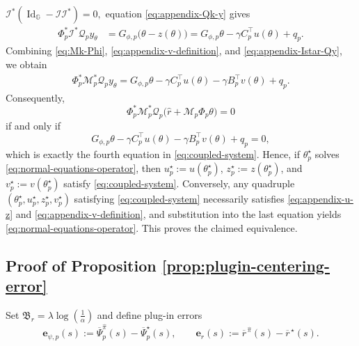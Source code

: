 \documentclass{article}
\theoremstyle{definition}
\theoremstyle{remark}
\theoremstyle{plain}
\newcommand{\dsieve}{p}
\numberwithin{equation}{section}
\begin{document}
\(
    \mathcal I^\ast
    (\operatorname{Id}_{\mathbb G}-\mathcal I\mathcal I^\ast)
    =
    0,
\)
equation \eqref{eq:appendix-Qk-y} gives
\begin{align}
    \Phi_\dsieve^\ast\mathcal I^\ast\mathcal Q_\dsieve y_\theta
    &=
    G_{\phi,\dsieve}\bigl(\theta-z(\theta)\bigr)
    =
    G_{\phi,\dsieve}\theta
    -
    \gamma C_\dsieve^\top u(\theta)
    +
    q_\dsieve.
\label{eq:appendix-Istar-Qy}
\end{align}
Combining \eqref{eq:Mk-Phi},
\eqref{eq:appendix-v-definition}, and \eqref{eq:appendix-Istar-Qy}, we obtain
\begin{align}
    \Phi_\dsieve^\ast\mathcal M_\dsieve^\ast\mathcal Q_\dsieve y_\theta
    =
    G_{\phi,\dsieve}\theta
    -
    \gamma C_\dsieve^\top u(\theta)
    -
    \gamma B_\dsieve^\top v(\theta)
    +
    q_\dsieve.
\label{eq:appendix-normal-equation-expanded}
\end{align}
Consequently,
\[
    \Phi_\dsieve^\ast\mathcal M_\dsieve^\ast\mathcal Q_\dsieve
    \bigl(
        \widehat r+\mathcal M_\dsieve\Phi_\dsieve\theta
    \bigr)
    =0
\]
if and only if
\[
    G_{\phi,\dsieve}\theta
    -
    \gamma C_\dsieve^\top u(\theta)
    -
    \gamma B_\dsieve^\top v(\theta)
    +
    q_\dsieve
    =0,
\]
which is exactly the fourth equation in \eqref{eq:coupled-system}.
Hence, if \(\theta_\dsieve^\star\) solves \eqref{eq:normal-equations-operator}, then
\(u_\dsieve^\star:=u(\theta_\dsieve^\star)\),
\(z_\dsieve^\star:=z(\theta_\dsieve^\star)\), and
\(v_\dsieve^\star:=v(\theta_\dsieve^\star)\) satisfy
\eqref{eq:coupled-system}. Conversely, any quadruple
\((\theta_\dsieve^\star,u_\dsieve^\star,z_\dsieve^\star,v_\dsieve^\star)\) satisfying
\eqref{eq:coupled-system} necessarily satisfies
\eqref{eq:appendix-u-z} and \eqref{eq:appendix-v-definition}, and substitution
into the last equation yields \eqref{eq:normal-equations-operator}. This proves
the claimed equivalence.




\subsection{Proof of Proposition \ref{prop:plugin-centering-error}}
\label{app:proof-plugin-centering}
Set \(\mathfrak B_r = \lambda\log\left(\frac{1}{\alpha}\right)\) and
define plug-in errors
\[
    \mathbf{e}_{\psi,\dsieve}(s)
    :=
    \overline\Psi_\dsieve^{\widehat\pi}(s)
    -
    \overline\Psi_\dsieve^\star(s),
    \qquad
    \mathbf{e}_r(s)
    :=
    \overline r^{\,\widehat\pi}(s)
    -
    \overline r^{\,\star}(s).
\]
\end{document}
